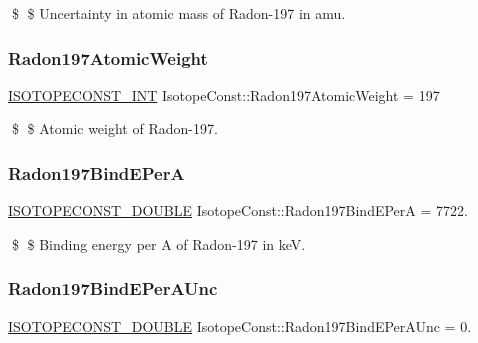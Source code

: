 \$ \$ Uncertainty in atomic mass of Radon-\/197 in amu. \mbox{\label{group___isotope_const-_radon-_rn197_gaa487c73ec9438698aa2361421ec0fced}} 
\subsubsection{\texorpdfstring{Radon197\+Atomic\+Weight}{Radon197AtomicWeight}}
{\footnotesize\ttfamily \mbox{\hyperlink{group___isotope_const-_macros_ga5f18360b3e99483a35c32d789e62621c}{I\+S\+O\+T\+O\+P\+E\+C\+O\+N\+S\+T\+\_\+\+I\+NT}} Isotope\+Const\+::\+Radon197\+Atomic\+Weight = 197}

\$ \$ Atomic weight of Radon-\/197. \mbox{\label{group___isotope_const-_radon-_rn197_gaeb5313741312a7915831fc87d67b4a84}} 
\subsubsection{\texorpdfstring{Radon197\+Bind\+E\+PerA}{Radon197BindEPerA}}
{\footnotesize\ttfamily \mbox{\hyperlink{group___isotope_const-_macros_ga8f45a7272ce02c0b4c65c44636ed719a}{I\+S\+O\+T\+O\+P\+E\+C\+O\+N\+S\+T\+\_\+\+D\+O\+U\+B\+LE}} Isotope\+Const\+::\+Radon197\+Bind\+E\+PerA = 7722.}

\$ \$ Binding energy per A of Radon-\/197 in keV. \mbox{\label{group___isotope_const-_radon-_rn197_ga74334960b8ff093b3effb3cffcc48bba}} 
\subsubsection{\texorpdfstring{Radon197\+Bind\+E\+Per\+A\+Unc}{Radon197BindEPerAUnc}}
{\footnotesize\ttfamily \mbox{\hyperlink{group___isotope_const-_macros_ga8f45a7272ce02c0b4c65c44636ed719a}{I\+S\+O\+T\+O\+P\+E\+C\+O\+N\+S\+T\+\_\+\+D\+O\+U\+B\+LE}} Isotope\+Const\+::\+Radon197\+Bind\+E\+Per\+A\+Unc = 0.}

